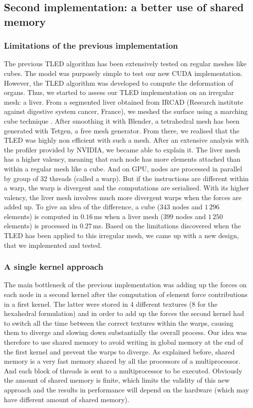 	\subsection{Second implementation: a better use of shared memory}	\label{chap6:secondTLED}

\subsubsection*{Limitations of the previous implementation}
The previous TLED algorithm has been extensively tested on regular meshes like cubes. The model was purposely simple to test our new CUDA implementation. However, the TLED algorithm was developed to compute the deformation of organs. Thus, we started to assess our TLED implementation on an irregular mesh: a liver. From a segmented liver obtained from IRCAD (Research institute against digestive system cancer, France), we meshed the surface using a marching cube technique \citep{Lorensen87}. After smoothing it with Blender, a tetrahedral mesh has been generated with Tetgen, a free mesh generator. From there, we realised that the TLED was highly non efficient with such a mesh. After an extensive analysis with the profiler provided by NVIDIA, we became able to explain it. The liver mesh has a higher valency, meaning that each node has more elements attached than within a regular mesh like a cube. And on GPU, nodes are processed in parallel by group of 32 threads (called a warp). But if the instructions are different within a warp, the warp is divergent and the computations are serialised. With its higher valency, the liver mesh involves much more divergent warps when the forces are added up. To give an idea of the difference, a cube ($343$ nodes and $1\,296$ elements) is computed in $0.16\,$ms when a liver mesh ($399$ nodes and $1\,250$ elements) is processed in $0.27\,$ms. Based on the limitations discovered when the TLED has been applied to this irregular mesh, we came up with a new design, that we implemented and tested.

\subsubsection*{A single kernel approach}
The main bottleneck of the previous implementation was adding up the forces on each node in a second kernel after the computation of element force contributions in a first kernel. The latter were stored in 4 different textures (8 for the hexahedral formulation) and in order to add up the forces the second kernel had to switch all the time between the correct textures within the warps, causing them to diverge and slowing down substantially the overall process. Our idea was therefore to use shared memory to avoid writing in global memory at the end of the first kernel and prevent the warps to diverge. As explained before, shared memory is a very fast memory shared by all the processors of a multiprocessor. And each block of threads is sent to a multiprocessor to be executed. Obviously the amount of shared memory is finite, which limits the validity of this new approach and the results in performance will depend on the hardware (which may have different amount of shared memory). 


